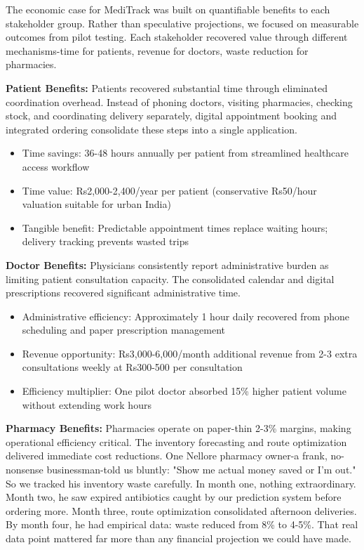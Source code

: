 \documentclass[12pt,a4paper]{report}
\begin{document}
The economic case for MediTrack was built on quantifiable benefits to each stakeholder group. Rather than speculative projections, we focused on measurable outcomes from pilot testing. Each stakeholder recovered value through different mechanisms-time for patients, revenue for doctors, waste reduction for pharmacies.

\textbf{Patient Benefits:} Patients recovered substantial time through eliminated coordination overhead. Instead of phoning doctors, visiting pharmacies, checking stock, and coordinating delivery separately, digital appointment booking and integrated ordering consolidate these steps into a single application.

\begin{itemize}
  \item Time savings: 36-48 hours annually per patient from streamlined healthcare access workflow
  \item Time value: Rs2,000-2,400/year per patient (conservative Rs50/hour valuation suitable for urban India)
  \item Tangible benefit: Predictable appointment times replace waiting hours; delivery tracking prevents wasted trips
\end{itemize}

\textbf{Doctor Benefits:} Physicians consistently report administrative burden as limiting patient consultation capacity. The consolidated calendar and digital prescriptions recovered significant administrative time.

\begin{itemize}
  \item Administrative efficiency: Approximately 1 hour daily recovered from phone scheduling and paper prescription management
  \item Revenue opportunity: Rs3,000-6,000/month additional revenue from 2-3 extra consultations weekly at Rs300-500 per consultation
  \item Efficiency multiplier: One pilot doctor absorbed 15\% higher patient volume without extending work hours
\end{itemize}

\textbf{Pharmacy Benefits:} Pharmacies operate on paper-thin 2-3\% margins, making operational efficiency critical. The inventory forecasting and route optimization delivered immediate cost reductions. One Nellore pharmacy owner-a frank, no-nonsense businessman-told us bluntly: "Show me actual money saved or I'm out." So we tracked his inventory waste carefully. In month one, nothing extraordinary. Month two, he saw expired antibiotics caught by our prediction system before ordering more. Month three, route optimization consolidated afternoon deliveries. By month four, he had empirical data: waste reduced from 8\% to 4-5\%. That real data point mattered far more than any financial projection we could have made.
\end{document}

